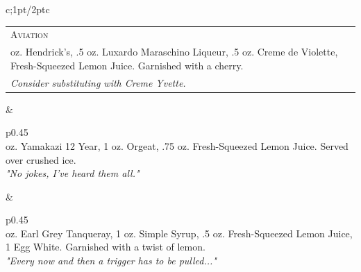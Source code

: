 \documentclass{article}
\begin{document}
\begin{tabular}{c;{1pt/2pt}c}
\begin{tabular}{p{}}
\multicolumn{1}{p{.45\textwidth}}{\centering\huge\textsc{Aviation}}\\ 
   \large\centering 2 oz. Hendrick's, .5 oz. Luxardo Maraschino Liqueur, .5 oz. Creme de Violette, Fresh-Squeezed Lemon Juice. Garnished with a cherry.\\ \normalsize\textit{Consider substituting with Creme Yvette.}
\end{tabular}
&
\\\hdashline[1pt/2pt]
\begin{tabular}{p{}}
\\ 
   \large{} oz. Yamakazi 12 Year, 1 oz. Orgeat, .75 oz. Fresh-Squeezed Lemon Juice. Served over crushed ice. \\ \normalsize\textit{"No jokes, I've heard them all."}
 \end{tabular}
&
\begin{tabular}{p{}}
\\ 
   \large{} oz. Earl Grey Tanqueray, 1 oz. Simple Syrup, .5 oz. Fresh-Squeezed Lemon Juice, 1 Egg White. Garnished with a twist of lemon.\\ \normalsize\textit{"Every now and then a trigger has to be pulled..."}
\end{tabular}

\end{tabular}\vspace{1.8in}
\end{document}
